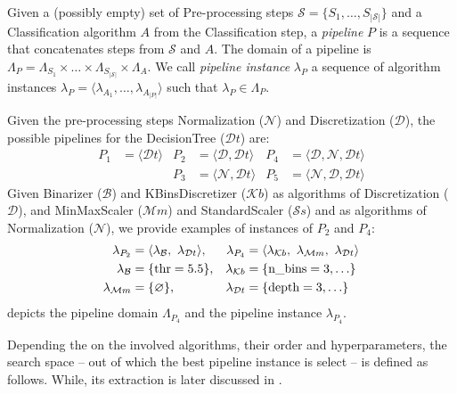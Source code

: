 \begin{definition}[Pipeline]
Given a (possibly empty) set of Pre-processing steps $\mathcal{S} = \{S_1,\ldots, S_{|\mathcal{S}|}\}$ and a Classification algorithm $A$ from the Classification step, a \emph{pipeline} $P$ is a sequence that concatenates steps from $\mathcal{S}$ and $A$.
The domain of a pipeline is $\Lambda_P = \Lambda_{S_1} \times \ldots \times \Lambda_{S_{|\mathcal{S}|}} \times \Lambda_A$.
We call \emph{pipeline instance} $\lambda_P$ a sequence of algorithm instances $\lambda_P = \langle \lambda_{A_1}, \ldots, \lambda_{A_{|P|}} \rangle$ such that $\lambda_P \in \Lambda_P$.
\end{definition}

\begin{example}
Given the pre-processing steps Normalization ($\mathcal{N}$) and Discretization ($\mathcal{D}$), the possible pipelines for the DecisionTree ($\mathcal{D}t$) are:
\begin{align*}
    P_1 &= \langle \mathcal{D}t \rangle &
    P_2 &= \langle \mathcal{D}, \mathcal{D}t \rangle & 
    P_4 &= \langle \mathcal{D}, \mathcal{N}, \mathcal{D}t \rangle \\
    &&
    P_3 &= \langle \mathcal{N}, \mathcal{D}t \rangle & P_5 &= \langle \mathcal{N}, \mathcal{D}, \mathcal{D}t \rangle
\end{align*}
Given \textup{Binarizer} ($\mathcal{B}$) and  \textup{KBinsDiscretizer} ($\mathcal{K}b$) as algorithms of Discretization ($\mathcal{D}$), and \textup{MinMaxScaler} ($\mathcal{M}m$) and \textup{StandardScaler} ($\mathcal{S}s$) and  as algorithms of Normalization ($\mathcal{N}$), we provide examples of instances of $P_2$ and $P_4$:
\begin{align*}
    \lambda_{P_2} &= \langle \lambda_{\mathcal{B}},~ \lambda_{\mathcal{D}t} \rangle, &\lambda_{P_4} &= \langle \lambda_{\mathcal{K}b},~ \lambda_{\mathcal{M}m},~ \lambda_{\mathcal{D}t} \rangle \\
    \lambda_{\mathcal{B}}&=\{ \textup{thr}=5.5 \}, &\lambda_{\mathcal{K}b}&=\{ \textup{n\_bins}=3, \ldots \}\\
    \lambda_{\mathcal{M}m}&=\{ \varnothing \}, &\lambda_{\mathcal{D}t}&= \{ \textup{depth}=3,\ldots\}
\end{align*}
 depicts the pipeline domain $\Lambda_{P_4}$ and the pipeline instance $\lambda_{P_4}$.
\label{ex:pipelineinstance}
\end{example}

Depending the on the involved algorithms, their order and hyperparameters, the search space -- out of which the best pipeline instance is select -- is defined as follows.
While, its extraction is later discussed in .

